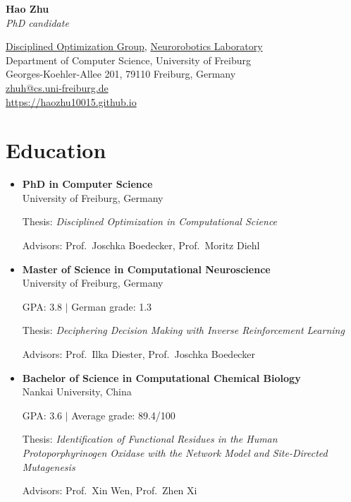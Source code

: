 \documentclass{article}
\newenvironment{cvblock}{%
    \begin{itemize}[
      leftmargin=1in,%
      labelsep=0.3in,%
      font=\itshape,%
      label={}%
    ]
}{%
    \end{itemize}
}
\begin{document}
\begin{center}
    \begin{minipage}[b]{0.3\textwidth}\flushleft
        {\Huge\sffamily\bfseries Hao Zhu}\\[0.5\baselineskip]
        {\Large\sffamily\itshape PhD candidate}\\
    \end{minipage}\hfill
    \begin{minipage}[b]{0.7\textwidth}\small\flushright
        \href{https://github.com/dxogrp}{Disciplined Optimization Group},
        \href{https://nr.informatik.uni-freiburg.de/people/hao-zhu}{Neurorobotics Laboratory}\\
        Department of Computer Science,
        University of Freiburg\\
        Georges-Koehler-Allee 201, 79110 Freiburg, Germany\\
        \href{mailto:zhuh@cs.uni-freiburg.de}{zhuh@cs.uni-freiburg.de}\\
        \href{https://haozhu10015.github.io}{https://haozhu10015.github.io}
    \end{minipage}
\end{center}
\vspace{0.5in}

\section{Education}
\begin{cvblock}
    \item[2024--] \textbf{PhD in Computer Science}\\
        University of Freiburg, Germany\par
        Thesis: \emph{Disciplined Optimization in Computational Science}\par
        Advisors: Prof.~Joschka Boedecker, Prof.~Moritz Diehl
    \item[2021--2023] \textbf{Master of Science in Computational Neuroscience}\\
        University of Freiburg, Germany\par
        GPA: 3.8 $\mid$ German grade: 1.3\par
        Thesis: \emph{Deciphering Decision Making with Inverse Reinforcement Learning}\par
        Advisors: Prof.~Ilka Diester, Prof.~Joschka Boedecker
    \item[2016--2020] \textbf{Bachelor of Science in Computational Chemical Biology}\\
        Nankai University, China\par
        GPA: 3.6 $\mid$ Average grade: 89.4/100\par
        Thesis: \emph{Identification of Functional Residues in the Human Protoporphyrinogen Oxidase with the Network Model and Site-Directed Mutagenesis}\par
        Advisors: Prof.~Xin Wen, Prof.~Zhen Xi
\end{cvblock}
\end{document}
